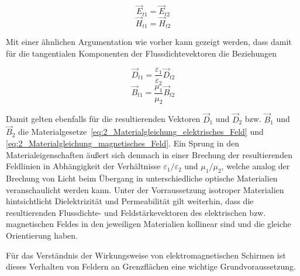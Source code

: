 \begin{equation}
    \vec E_{t1} = \vec E_{t2}
\end{equation}
\begin{equation}
    \vec H_{t1} = \vec H_{t2}
\end{equation}

Mit einer ähnlichen Argumentation wie vorher kann gezeigt werden, dass damit für die tangentialen Komponenten der Flussdichtevektoren die Beziehungen

\begin{equation}
    \vec D_{t1} = \frac{\varepsilon_1}{\varepsilon_2} \vec D_{t2}
\end{equation}
\begin{equation}
    \vec B_{t1} = \frac{\mu_1}{\mu_2} \vec B_{t2}
\end{equation}

Damit gelten ebenfalls für die resultierenden Vektoren $\vec D_1$ und $\vec D_2$ bzw. $\vec B_1$ und $\vec B_2$ die Materialgesetze~\ref{eq:2_Materialgleichung_elektrisches_Feld} und \ref{eq:2_Materialgleichung_magnetisches_Feld}. Ein Sprung in den Materialeigenschaften äußert sich demnach in einer Brechung der resultierenden Feldlinien in Abhängigkeit der Verhältnisse $\varepsilon_1 / \varepsilon_2$ und $\mu_1 / \mu_2$, welche analog der Brechung von Licht beim Übergang in unterschiedliche optische Materialien veranschaulicht werden kann. Unter der Vorraussetzung isotroper Materialien hintsichtlicht Dielektrizität und Permeabilität gilt weiterhin, dass die resultierenden Flussdichte- und Feldstärkevektoren des elektrischen bzw. magnetischen Feldes in den jeweiligen Materialien kollinear sind und die gleiche Orientierung haben.

\par
\vspace{\linespace}

Für das Verständnis der Wirkungsweise von elektromagnetischen Schirmen ist dieses Verhalten von Feldern an Grenzflächen eine wichtige Grundvoraussetzung.












